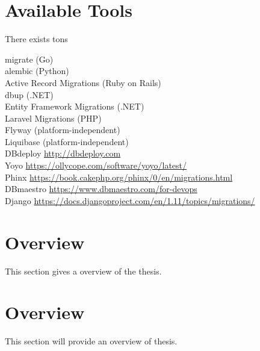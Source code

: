 \section{Available Tools}%
There exists tons 


migrate (Go)\\
alembic (Python)\\
Active Record Migrations (Ruby on Rails)\\
dbup (.NET)\\
Entity Framework Migrations (.NET)\\
Laravel Migrations (PHP)\\
Flyway (platform-independent)\\
Liquibase (platform-independent)\\
DBdeploy \url{http://dbdeploy.com}\\
Yoyo \url{https://ollycope.com/software/yoyo/latest/}\\
Phinx \url{https://book.cakephp.org/phinx/0/en/migrations.html}\\
DBmaestro \url{https://www.dbmaestro.com/for-devops}\\
Django \url{https://docs.djangoproject.com/en/1.11/topics/migrations/}



\section{Overview}%
This section gives a overview of the thesis.



\section{Overview}%
This section will provide an overview of thesis.


\newpage